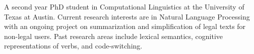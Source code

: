 %
%
%
\par{A second year PhD student in Computational Linguistics at the University of Texas at Austin. Current research interests are in Natural Language Processing with an ongoing project on summarization and simplification of legal texts for non-legal users. Past research areas include lexical semantics, cognitive representations of verbs, and code-switching.
}